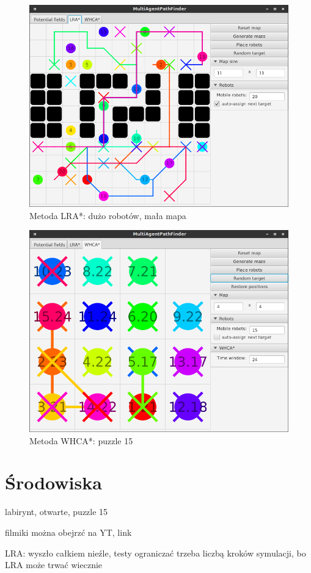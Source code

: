 \begin{figure}
	\centering
	\includegraphics[width=0.8\columnwidth]{img/robopath/lra-lot-robots}
	\caption{Metoda LRA*: dużo robotów, mała mapa}
	\label{fig:app-tech-intellij}
\end{figure}

\begin{figure}
	\centering
	\includegraphics[width=0.8\columnwidth]{img/robopath/puzzle-15}
	\caption{Metoda WHCA*: puzzle 15}
	\label{fig:app-tech-intellij}
\end{figure}

\section{Środowiska}
labirynt, otwarte, puzzle 15

filmiki można obejrzć na YT, link

LRA: wyszło całkiem nieźle,
testy ograniczać trzeba liczbą kroków symulacji, bo LRA może trwać wiecznie

